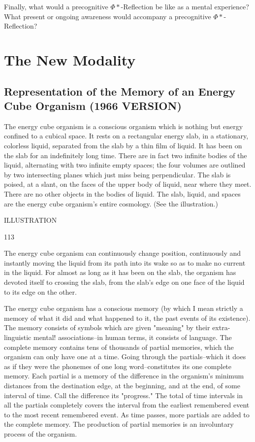 \documentclass[10pt,twoside]{memoir}
\begin{document}
\begin{enumerate}
{\begin{enumerate}
\begin{sysrules}
\begin{sysrules}
\begin{sysrules}
\begin{sysrules}
{\begin{enumerate}
Finally, what would a precognitive $\Phi*$-Reflection be like as a mental 
experience? What present or ongoing awareness would accompany a 
precognitive $\Phi*$-Reflection? 

\part{The New Modality}

\chapter{Representation of the Memory of an Energy Cube Organism (1966 VERSION)}


The energy cube organism is a conscious organism which is nothing but 
energy confined to a cubical space. It rests on a rectangular energy slab, in a 
stationary, colorless liquid, separated from the slab by a thin film of liquid. 
It has been on the slab for an indefinitely long time. There are in fact two 
infinite bodies of the liquid, alternating with two infinite empty spaces; the 
four volumes are outlined by two intersecting planes which just miss being 
perpendicular. The slab is poised, at a slant, on the faces of the upper body 
of liquid, near where they meet. There are no other objects in the bodies of 
liquid. The slab, liquid, and spaces are the energy cube organism's entire 
cosmology. (See the illustration.) 


ILLUSTRATION 


113 


The energy cube organism can continuously change position, 
continuously and instantly moving the liquid from its path into its wake so 
as to make no current in the liquid. For almost as long as it has been on the 
slab, the organism has devoted itself to crossing the slab, from the slab's edge 
on one face of the liquid to its edge on the other. 

The energy cube organism has a conscious memory (by which I mean 
strictly a memory of what it did and what happened to it, the past events of 
its existence). The memory consists of symbols which are given "meaning" 
by their extra-linguistic mental! associations--in human terms, it consists of 
language. The complete memory contains tens of thousands of partial 
memories, which the organism can only have one at a time. Going through 
the partials--which it does as if they were the phonemes of one long 
word--constitutes its one complete memory. Each partial is a memory of the 
difference in the organism's minimum distances from the destination edge, at 
the beginning, and at the end, of some interval of time. Call the difference its 
"progress." The total of time intervals in all the partials completely covers 
the interval from the earliest remembered event to the most recent 
remembered event. As time passes, more partials are added to the complete 
memory. The production of partial memories is an involuntary process of 
the organism. 


\end{enumerate}}
\end{sysrules}
\end{sysrules}
\end{sysrules}
\end{sysrules}
\end{enumerate}}
\end{enumerate}
\end{document}
